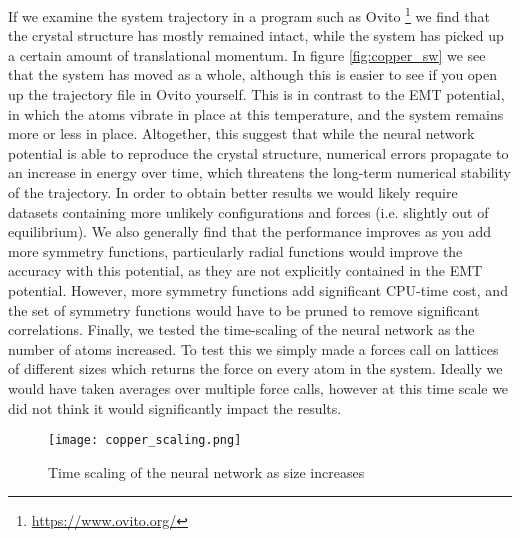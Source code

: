 If we examine the system trajectory in a program such as Ovito
\footnote{\href{Open VIsualization TOol}{https://www.ovito.org/}}
we find that the crystal structure has mostly remained intact, while the
system has picked up a certain amount of translational momentum.
In figure \ref{fig:copper_sw} we see that the system has moved as a whole,
although this is easier to see if you open up the trajectory file in Ovito
yourself.
This is in contrast to the EMT potential, in which the atoms vibrate in place
at this temperature, and the system remains more or less in place.
Altogether, this suggest that while the neural network potential
is able to reproduce the crystal structure, numerical errors propagate
to an increase in energy over time, which threatens the long-term numerical
stability of the trajectory. In order to obtain better results we would likely
require datasets containing more unlikely configurations and forces
(i.e. slightly out of equilibrium). We also generally find that the performance
improves as you add more symmetry functions, particularly radial functions
would improve the accuracy with this potential, as they are not explicitly
contained in the EMT potential. However, more symmetry functions
add significant CPU-time cost, and the set of symmetry functions would have to be pruned
to remove significant correlations.
Finally, we tested the time-scaling of the neural network as the number of atoms
increased. To test this we simply made a forces call on lattices of different
sizes which returns the force on every atom in the system.
Ideally we would have taken averages over multiple force calls, however
at this time scale we did not think it would significantly impact the results.

\begin{figure}
\texttt{[image: copper\_scaling.png]}
\caption{Time scaling of the neural network as size increases}
\label{fig:copper-scaling}
\end{figure}

